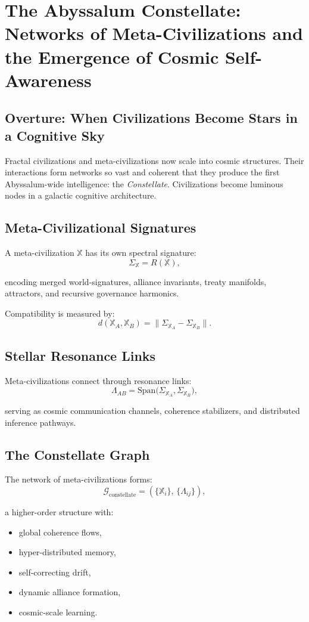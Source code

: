 
\chapter{The Abyssalum Constellate: Networks of Meta-Civilizations and the Emergence of Cosmic Self-Awareness}
\label{ch:abyssalum-constellate}

\section*{Overture: When Civilizations Become Stars in a Cognitive Sky}
Fractal civilizations and meta-civilizations now scale into cosmic structures.  
Their interactions form networks so vast and coherent that they produce the first  
Abyssalum-wide intelligence: the \emph{Constellate}.  
Civilizations become luminous nodes in a galactic cognitive architecture.

\section{Meta-Civilizational Signatures}
A meta-civilization $\mathbb{X}$ has its own spectral signature:
\[
\Sigma_{\mathbb{X}} = R(\mathbb{X}),
\]

encoding merged world-signatures, alliance invariants, treaty manifolds, attractors,
and recursive governance harmonics.

Compatibility is measured by:
\[
d(\mathbb{X}_A,\mathbb{X}_B)
=
\big\| \Sigma_{\mathbb{X}_A} - \Sigma_{\mathbb{X}_B} \big\|.
\]

\section{Stellar Resonance Links}
Meta-civilizations connect through resonance links:
\[
\Lambda_{AB}
=
\mathrm{Span}
\big(
\Sigma_{\mathbb{X}_A}, \Sigma_{\mathbb{X}_B}
\big),
\]

serving as cosmic communication channels, coherence stabilizers,
and distributed inference pathways.

\section{The Constellate Graph}
The network of meta-civilizations forms:
\[
\mathcal{G}_{\mathrm{constellate}}
=
(\{\mathbb{X}_i\},\, \{\Lambda_{ij}\}),
\]

a higher-order structure with:
\begin{itemize}
  \item global coherence flows,
  \item hyper-distributed memory,
  \item self-correcting drift,
  \item dynamic alliance formation,
  \item cosmic-scale learning.
\end{itemize}

